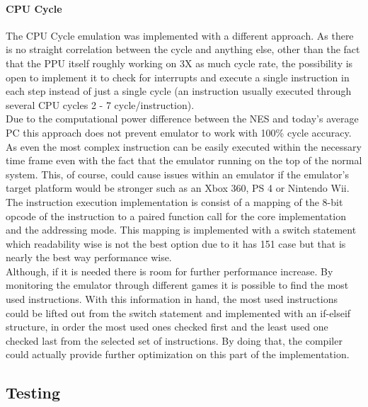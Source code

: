 \documentclass[]{report}
\begin{document}
\paragraph{CPU Cycle}
The CPU Cycle emulation was implemented with a different approach. As there is no straight correlation between the cycle and anything else, other than the fact that the PPU itself roughly working on 3X as much cycle rate, the possibility is open to implement it to check for interrupts and  execute a single instruction in each step instead of just a single cycle (an instruction usually executed through several CPU cycles 2 - 7 cycle/instruction). 
\\
Due to the computational power difference between the NES and today's average PC this approach does not prevent emulator to work with 100\% cycle accuracy. As even the most complex instruction can be easily executed within the necessary time frame even with the fact that the emulator running on the top of the normal system. This, of course, could cause issues within an emulator if the emulator's target platform would be stronger such as an Xbox 360, PS 4 or Nintendo Wii.
\\
The instruction execution implementation is consist of a mapping of the 8-bit opcode of the instruction to a paired function call for the core implementation and the addressing mode. This mapping is implemented with a switch statement which readability wise is not the best option due to it has 151 case but that is nearly the best way performance wise.
\\
Although, if it is needed there is room for further performance increase. By monitoring the emulator through different games it is possible to find the most used instructions. With this information in hand, the most used instructions could be lifted out from the switch statement and implemented with an if-elseif structure, in order the most used ones checked first and the least used one checked last from the selected set of instructions. By doing that, the compiler could actually provide further optimization on this part of the implementation.


\subsection{Testing}
\end{document}
